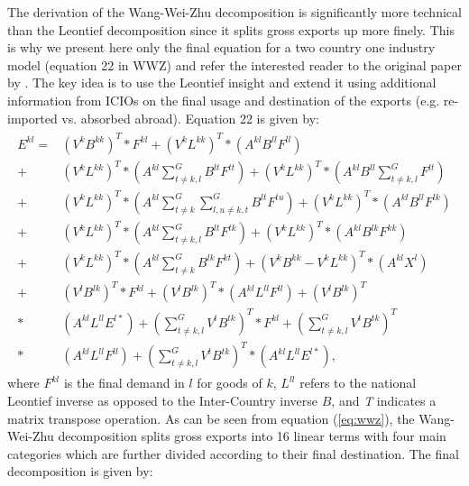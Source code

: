 \documentclass[a4paper,11pt]{article}
\begin{document}
The derivation of the Wang-Wei-Zhu decomposition is significantly more technical than the Leontief decomposition since it splits gross exports up more finely. This is why we present here only the final equation for a two country one industry model (equation 22 in WWZ) and refer the interested reader to the original paper by \citet{zhwaetal13}. The key idea is to use the Leontief insight and extend it using additional information from ICIOs on the final usage and destination of the exports (e.g. re-imported vs. absorbed abroad). Equation 22 is given by:
\begin{align}
\label{eq:wwz}
\begin{split}
E^{kl}
= &\left(V^k B^{kk} \right)^T * F^{kl} 
+ \left(V^k L^{kk} \right)^T * \left(A^{kl} B^{ll} F^{ll} \right)\\
+& \left(V^k L^{kk} \right)^T * (A^{kl} \sum_{t \neq k,l}^G  B^{lt} F^{tt} )
+ \left(V^k L^{kk} \right)^T *  (A^{kl} B^{ll} \sum_{t \neq k,l}^G  F^{lt} )\\ 
+&  \left(V^k L^{kk} \right)^T * (A^{kl} \sum_{t \neq k}^G \sum_{l,u \neq k,t}^G B^{lt} F^{tu} )
+ \left(V^k L^{kk} \right)^T * \left(A^{kl} B^{ll} F^{lk} \right)\\
+& \left(V^k L^{kk} \right)^T * (A^{kl} \sum_{t \neq k,l}^G  B^{lt} F^{tk} )
+ \left(V^k L^{kk} \right)^T * \left(A^{kl} B^{lk} F^{kk} \right) \\
+& \left(V^k L^{kk} \right)^T * (A^{kl} \sum_{t \neq k}^G  B^{lk} F^{kt} )
+ \left(V^k B^{kk} -  V^k L^{kk} \right)^T * \left(A^{kl} X^{l}  \right)\\
+& \left(V^l B^{lk} \right)^T * F^{kl}
+ \left(V^l B^{lk} \right)^T *  \left(A^{kl} L^{ll} F^{ll} \right)
+ \left(V^l B^{lk} \right)^T \\
*&  \left(A^{kl} L^{ll} E^{l*} \right) + (\sum_{t \neq k,l}^G  V^{t} B^{tk} )^{T} * F^{kl}
+ (\sum_{t \neq k,l}^G  V^{t} B^{tk} )^{T}\\
*&   \left(A^{kl} L^{ll} F^{ll} \right) + (\sum_{t \neq k,l}^G  V^{t} B^{tk} )^{T} *  \left(A^{kl} L^{ll} E^{l*} \right) ,
\end{split}
\end{align}
where $F^{kl}$ is the final demand in $l$ for goods of $k$, $L^{ll}$ refers to the national Leontief inverse as opposed to the Inter-Country inverse $B$, and \textit{T} indicates a matrix transpose operation. As can be seen from equation (\ref{eq:wwz}), the Wang-Wei-Zhu decomposition splits gross exports into 16 linear terms with four main categories which are further divided according to their final destination. The final decomposition is given by:
\end{document}
